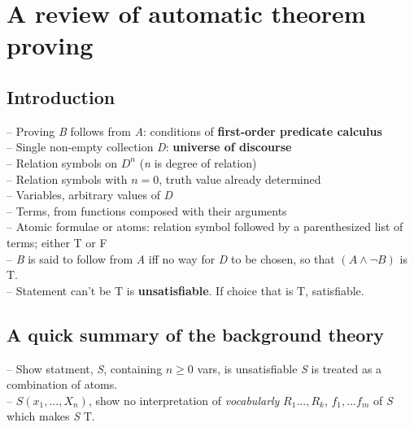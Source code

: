
\section{A review of automatic theorem proving}

\subsection{Introduction}
-- Proving \textit{B} follows from \textit{A}: conditions of \textbf{first-order predicate calculus}\\
-- Single non-empty collection \textit{D}: \textbf{universe of discourse}\\
-- Relation symbols on $D^{n}$ (\textit{n} is degree of relation)\\
-- Relation symbols with $n=0$, truth value already determined\\
-- Variables, arbitrary values of \textit{D}\\
-- Terms, from functions composed with their arguments\\
-- Atomic formulae or atoms: relation symbol followed by a parenthesized list of terms; either T or F\\
-- \textit{B} is said to follow from \textit{A} iff no way for \textit{D} to be chosen, so that $(A \land \lnot B)$ is T.\\
-- Statement can't be T is \textbf{unsatisfiable}.  If choice that is T, satisfiable.\\

\subsection{A quick summary of the background theory}
-- Show statment, \textit{S}, containing $n \ge 0$ vars, is unsatisfiable \textit{S} is treated as a combination of atoms. \\
-- $S(x_1, ..., X_n)$, show no interpretation of \textit{vocabularly} $R_1 ..., R_k$, $f_1, ...f_m$ of \textit{S} which makes \textit{S} T.\\

